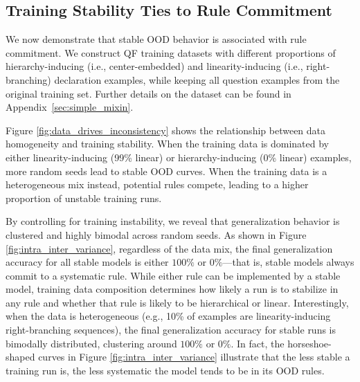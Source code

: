 \subsection{Training Stability Ties to Rule Commitment}
\label{sec:intra_inter}

We now demonstrate that stable OOD behavior is associated with rule commitment. We construct QF training datasets with different proportions of hierarchy-inducing (i.e., center-embedded) and linearity-inducing (i.e., right-branching) declaration examples, while keeping all question examples from the original training set. Further details on the dataset can be found in Appendix~\ref{sec:simple_mixin}.


Figure \ref{fig:data_drives_inconsistency} shows the relationship between data homogeneity and training stability. When the training data is dominated by either linearity-inducing  (99\% linear) or hierarchy-inducing  (0\% linear) examples, more random seeds lead to stable OOD curves. When the training data is a heterogeneous mix instead, potential rules compete, leading to a higher proportion of unstable training runs.

By controlling for training instability, we reveal that generalization behavior is clustered and highly bimodal across random seeds. As shown in Figure \ref{fig:intra_inter_variance}, regardless of the data mix, the final generalization accuracy for all stable models is either $100\%$ or $0\%$---that is, stable models always commit to a systematic rule. 
While either rule can be implemented by a stable model, training data composition determines how likely a run is to stabilize in any rule and whether that rule is likely to be hierarchical or linear. 
Interestingly, when the data is heterogeneous (e.g., 10\% of examples are linearity-inducing right-branching sequences), the final generalization accuracy for stable runs is bimodally distributed, clustering around $100\%$ or $0\%$. 
 In fact, the horseshoe-shaped curves in Figure \ref{fig:intra_inter_variance} illustrate that the less stable a training run is, the less systematic the model tends to be in its OOD rules. 

